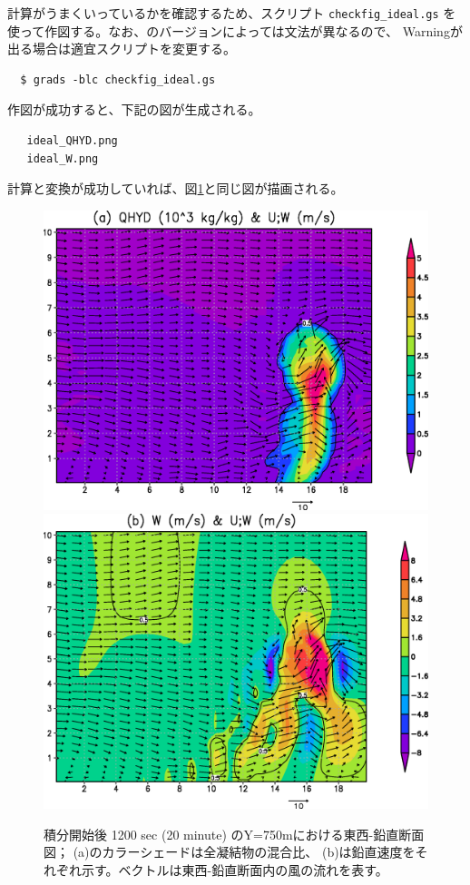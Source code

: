 計算がうまくいっているかを確認するため、\grads スクリプト \verb|checkfig_ideal.gs|
を使って作図する。なお、\grads のバージョンによっては文法が異なるので、
Warningが出る場合は適宜\grads スクリプトを変更する。
\begin{verbatim}
  $ grads -blc checkfig_ideal.gs
\end{verbatim}
作図が成功すると、下記の図が生成される。
\begin{verbatim}
   ideal_QHYD.png
   ideal_W.png
\end{verbatim}
計算と変換が成功していれば、図\ref{fig_ideal}と同じ図が描画される。

\begin{figure}[t]
\begin{center}
  \includegraphics[width=0.7\hsize]{./figure/ideal_qhyd.eps}\\
  \includegraphics[width=0.7\hsize]{./figure/ideal_W.eps}\\
  \caption{積分開始後 1200 sec (20 minute) のY=750mにおける東西-鉛直断面図；
           (a)のカラーシェードは全凝結物の混合比、
           (b)は鉛直速度をそれぞれ示す。ベクトルは東西-鉛直断面内の風の流れを表す。}
  \label{fig_ideal}
\end{center}
\end{figure}


